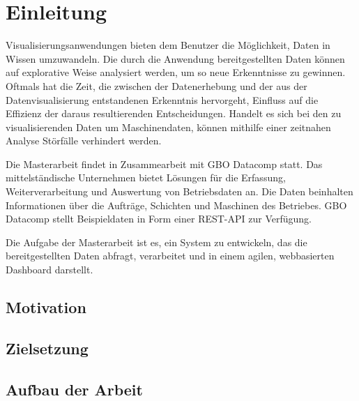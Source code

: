 \chapter{Einleitung}
\label{chap:einleitung}
Visualisierungsanwendungen bieten dem Benutzer die Möglichkeit,
Daten in Wissen umzuwandeln. Die durch die Anwendung bereitgestellten
Daten können auf explorative Weise analysiert werden, um so neue
Erkenntnisse zu gewinnen. Oftmals hat die Zeit, die zwischen der 
Datenerhebung und der aus der Datenvisualisierung entstandenen Erkenntnis
hervorgeht, Einfluss auf die Effizienz der daraus resultierenden Entscheidungen.
Handelt es sich bei den zu visualisierenden Daten um Maschinendaten,
können mithilfe einer zeitnahen Analyse Störfälle verhindert werden.

Die Masterarbeit findet in Zusammearbeit mit GBO Datacomp statt.
Das mittelständische Unternehmen bietet Lösungen für die Erfassung,
Weiterverarbeitung und Auswertung von Betriebsdaten an. Die Daten
beinhalten Informationen über die Aufträge, Schichten und Maschinen
des Betriebes. GBO Datacomp stellt Beispieldaten in Form einer REST-API
zur Verfügung.

Die Aufgabe der Masterarbeit ist es, ein System zu entwickeln, das die 
bereitgestellten Daten abfragt, verarbeitet und in einem agilen, webbasierten Dashboard
darstellt.

\section{Motivation}
\label{sec:motivation}


\section{Zielsetzung}
\label{sec:zielsetzung}

\section{Aufbau der Arbeit}
\label{sec:aufbauderarbeit}





